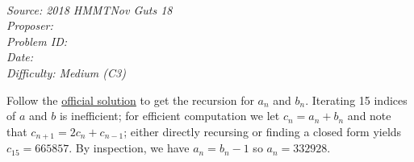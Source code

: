 \SSbreak\\
\emph{Source: 2018 HMMTNov Guts 18}\\
\emph{Proposer: \Paiya}\\ %
\emph{Problem ID:}\\
\emph{Date: }\\
\emph{Difficulty: Medium (C3)}\\
\SSbreak

\bigskip

\begin{solution}\hfil\medskip
	
    Follow the \href{https://hmmt-archive.s3.amazonaws.com/tournaments/2018/nov/guts/solutions.pdf}{official solution} to get the recursion for $a_n$ and $b_n$.
    Iterating 15 indices of $a$ and $b$ is inefficient; for efficient computation we let $c_n = a_n + b_n$ and note that $c_{n + 1} = 2c_n + c_{n - 1}$; either directly recursing or finding a closed form yields 
    $c_{15} = 665857$. By inspection, we have $a_n = b_n - 1$ so $a_n = \boxed{332928}$.
\end{solution}\bigskip